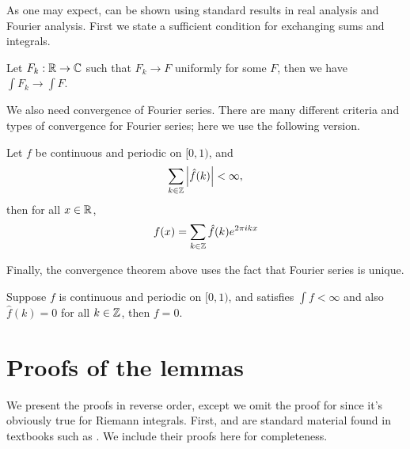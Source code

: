 \documentclass{article}
\begin{document}
As one may expect,  can be shown using standard results in real analysis and Fourier analysis.
First we state a sufficient condition for exchanging sums and integrals.
\begin{theorem}
	\label{theorem:exchange-sum-and-integral}
	Let $F_k:\mathbb{R}\rightarrow\mathbb{C}$ such that $F_k\rightarrow F$ uniformly for some $F$, then we have $\int F_k\rightarrow \int F$.
\end{theorem}
We also need convergence of Fourier series.
There are many different criteria and types of convergence for Fourier series;
here we use the following version.
\begin{theorem}
	\label{theorem:Fourier-converge}
	Let $f$ be continuous and periodic on $[0, 1)$, and
	\begin{equation}
		\sum_{k\in\mathbb{Z}}\abs{\hat{f}(k)}<\infty,
	\end{equation}
	then for all $x\in\mathbb{R}$,
	\begin{equation}
		f(x)=\sum_{k\in\mathbb{Z}}\hat{f}(k)e^{2\pi ikx}
	\end{equation}
\end{theorem}
Finally, the convergence theorem above uses the fact that Fourier series is unique.
\begin{theorem}
	\label{theorem:Fourier-unique}
	Suppose $f$ is continuous and periodic on $[0, 1)$, and satisfies $\int f<\infty$ and also $\hat{f}(k)=0$ for all $k\in\mathbb{Z}$, then $f=0$.
\end{theorem}

\section{Proofs of the lemmas}

We present the proofs in reverse order, except we omit the proof for  since it's obviously true for Riemann integrals.
First,  and  are standard material found in textbooks such as \cite{fourier-textbook}.
We include their proofs here for completeness.
\end{document}
